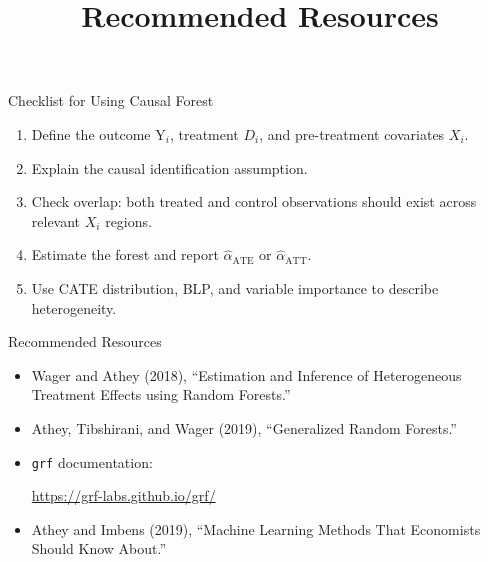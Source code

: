 \documentclass[hyperref={pdfpagelabels=false}]{beamer}
\begin{document}
\begin{frame}{Checklist for Using Causal Forest}
\begin{enumerate}
  \item Define the outcome $\mathrm{Y}_i$, treatment $D_i$, and pre-treatment covariates $X_i$.
  \vspace{0.15cm}
  \item Explain the causal identification assumption.
  \vspace{0.15cm}
  \item Check overlap: both treated and control observations should exist across relevant $X_i$ regions.
  \vspace{0.15cm}
  \item Estimate the forest and report $\hat{\alpha}_{\text{ATE}}$ or $\hat{\alpha}_{\text{ATT}}$.
  \vspace{0.15cm}
  \item Use CATE distribution, BLP, and variable importance to describe heterogeneity.
\end{enumerate}
\end{frame}

\title[]
{Recommended Resources}

\subtitle{}
\author{}
\institute{}
\date{}

\begin{frame}{}
  \titlepage
\end{frame}

\begin{frame}{Recommended Resources}
\begin{itemize}
  \item Wager and Athey (2018), ``Estimation and Inference of Heterogeneous Treatment Effects using Random Forests.''
  \vspace{0.2cm}
  \item Athey, Tibshirani, and Wager (2019), ``Generalized Random Forests.''
  \vspace{0.2cm}
  \item \texttt{grf} documentation:
  \begin{center}
    \url{https://grf-labs.github.io/grf/}
  \end{center}
  \vspace{0.2cm}
  \item Athey and Imbens (2019), ``Machine Learning Methods That Economists Should Know About.''
\end{itemize}
\end{frame}
\end{document}
